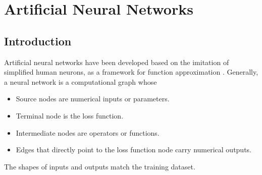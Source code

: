 \section{Artificial Neural Networks}
\subsection{Introduction}
Artificial neural networks have been developed based on the imitation of simplified human neurons, as a framework for function approximation \cite{mcculloch1943logical}. Generally, a neural network is a computational graph whose

\begin{itemize}
  \item Source nodes are numerical inputs or parameters.
  \item Terminal node is the loss function.
  \item Intermediate nodes are operators or functions.
  \item Edges that directly point to the loss function node carry numerical outputs.
\end{itemize}

The shapes of inputs and outputs match the training dataset.


